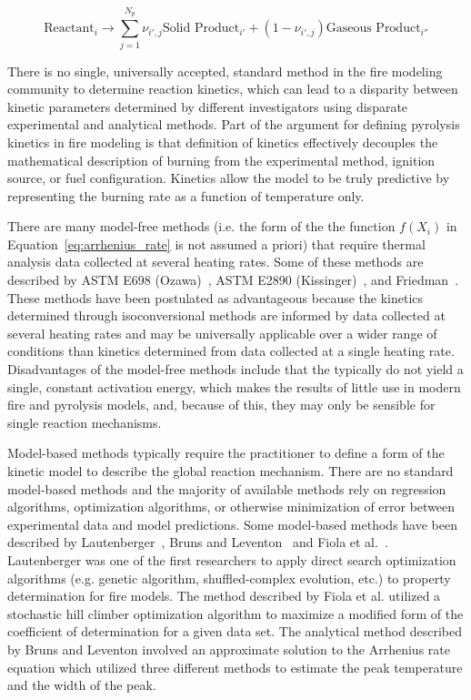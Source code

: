 \documentclass[12pt,oneside]{book}
\begin{document}
\begin{equation}
\textrm{Reactant}_{i} \to \sum_{j=1}^{N_p}\nu_{i',j} \textrm{Solid Product}_{i'} + (1-\nu_{i',j}) \textrm{Gaseous Product}_{i''} \label{eq:reaction_eqn}
\end{equation}

There is no single, universally accepted, standard method in the fire modeling community to determine reaction kinetics, which can lead to a disparity between kinetic parameters determined by different investigators using disparate experimental and analytical methods. Part of the argument for defining pyrolysis kinetics in fire modeling is that definition of kinetics effectively decouples the mathematical description of burning from the experimental method, ignition source, or fuel configuration. Kinetics allow the model to be truly predictive by representing the burning rate as a function of temperature only.

There are many model-free methods (i.e. the form of the the function $f(X_{i})$ in Equation~\ref{eq:arrhenius_rate} is not assumed a priori) that require thermal analysis data collected at several heating rates. Some of these methods are described by ASTM E698 (Ozawa)~\cite{ASTM_E698}, ASTM E2890 (Kissinger)~\cite{ASTM_E2890}, and Friedman~\cite{Friedman}. These methods have been postulated as advantageous because the kinetics determined through isoconversional methods are informed by data collected at several heating rates and may be universally applicable over a wider range of conditions than kinetics determined from data collected at a single heating rate. Disadvantages of the model-free methods include that the typically do not yield a single, constant activation energy, which makes the results of little use in modern fire and pyrolysis models, and, because of this, they may only be sensible for single reaction mechanisms. 

Model-based methods typically require the practitioner to define a form of the kinetic model to describe the global reaction mechanism. There are no standard model-based methods and the majority of available methods rely on regression algorithms, optimization algorithms, or otherwise minimization of error between experimental data and model predictions. Some model-based methods have been described by Lautenberger~\cite{Lautenberger:2006,Lautenberger_2011}, Bruns and Leventon~\cite{Bruns_2021} and Fiola et al.~\cite{Fiola_2021}. Lautenberger was one of the first researchers to apply direct search optimization algorithms (e.g. genetic algorithm, shuffled-complex evolution, etc.) to property determination for fire models. The method described by Fiola et al. utilized a stochastic hill climber optimization algorithm to maximize a modified form of the coefficient of determination for a given data set. The analytical method described by Bruns and Leventon involved an approximate solution to the Arrhenius rate equation which utilized three different methods to estimate the peak temperature and the width of the peak. 
\end{document}
